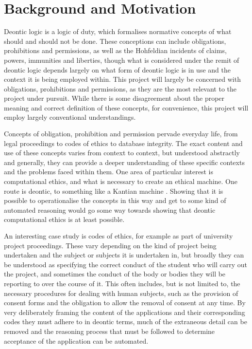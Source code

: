 \documentclass{l4proj}
\begin{document}
\section{Background and Motivation}%
Deontic logic is a logic of duty, which formalises normative concepts of what should and should not be done. These conceptions can include obligations, prohibitions and permissions, as well as the Hohfeldian incidents \cite{Hohfeld} of claims, powers, immunities and liberties, though what is considered under the remit of deontic logic depends largely on what form of deontic logic is in use and the context it is being employed within. This project will largely be concerned with obligations, prohibitions and permissions, as they are the most relevant to the project under pursuit. While there is some disagreement about the proper meaning and correct definition of these concepts, for convenience, this project will employ largely conventional understandings. 

Concepts of obligation, prohibition and permission pervade everyday life, from legal proceedings to codes of ethics to database integrity. The exact content and use of these concepts varies from context to context, but understood abstractly and generally, they can provide a deeper understanding of these specific contexts and the problems faced within them. One area of particular interest is computational ethics, and what is necessary to create an ethical machine. One route is deontic, to something like a Kantian machine \cite{Powers}. Showing that it is possible to operationalise the concepts in this way and get to some kind of automated reasoning would go some way towards showing that deontic computational ethics is at least possible. 

An interesting case study is codes of ethics, for example as part of university project proceedings. These vary depending on the kind of project being undertaken and the subject or subjects it is undertaken in, but broadly they can be understood as specifying the correct conduct of the student who will carry out the project, and sometimes the conduct of the body or bodies they will be reporting to over the course of it. This often includes, but is not limited to, the necessary procedures for dealing with human subjects, such as the provision of consent forms and the obligation to allow the removal of consent at any time. By very deliberately framing the content of the applications and their corresponding codes they must adhere to in deontic terms, much of the extraneous detail can be removed and the reasoning process that must be followed to determine acceptance of the application can be automated.
\end{document}
